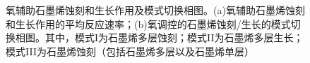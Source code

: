 \begin{figure}[tb]
    \caption{氧辅助石墨烯蚀刻和生长作用及模式切换相图。(a)氧辅助石墨烯蚀刻和生长作用的平均反应速率；(b)氧调控的石墨烯蚀刻/生长的模式切换相图。其中，模式I为石墨烯多层蚀刻；模式II为石墨烯多层生长；模式III为石墨烯蚀刻（包括石墨烯多层以及石墨烯单层）}
    \label{fig:FLG_model}
\end{figure}

